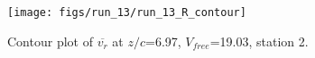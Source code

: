 \begin{figure}[H]
\centering
\texttt{[image: figs/run\_13/run\_13\_R\_contour]}
\caption{Contour plot of $\overline{v_{r}}$ at $z/c$=6.97, $V_{free}$=19.03, station 2.}
\label{fig:run_13_R_contour}
\end{figure}


